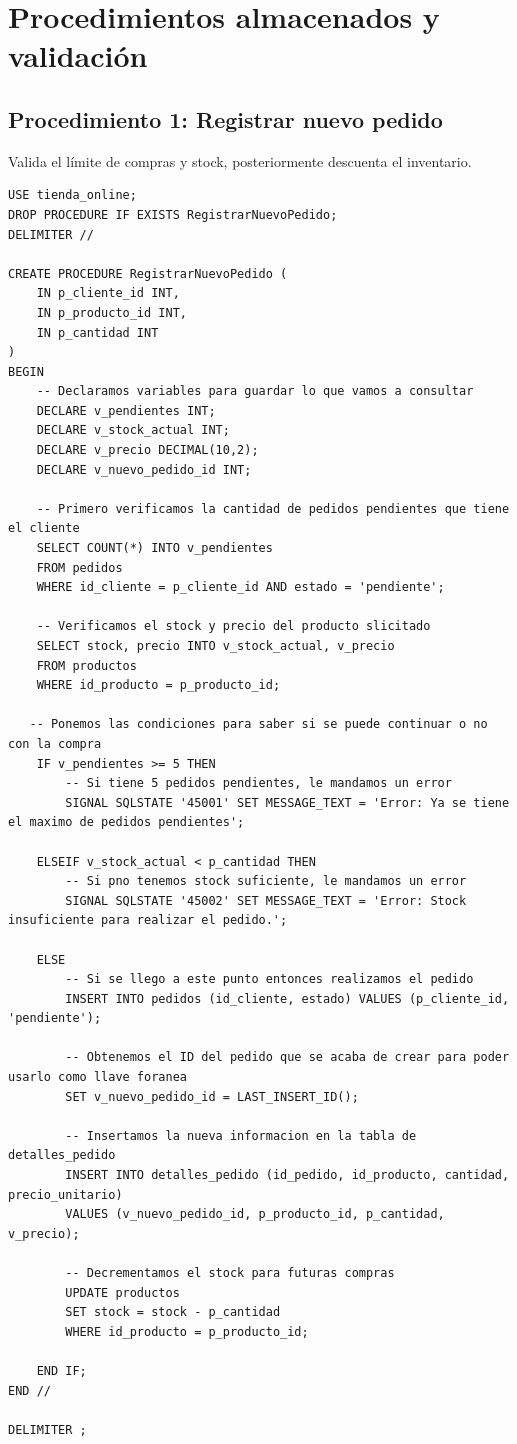 \documentclass[12pt,a4paper]{article}
\begin{document}
\section{Procedimientos almacenados y validación}

\subsection{Procedimiento 1: Registrar nuevo pedido}
Valida el límite de compras y stock, posteriormente descuenta el inventario.
\begin{lstlisting}
USE tienda_online;
DROP PROCEDURE IF EXISTS RegistrarNuevoPedido;
DELIMITER //

CREATE PROCEDURE RegistrarNuevoPedido (
    IN p_cliente_id INT,
    IN p_producto_id INT,
    IN p_cantidad INT
)
BEGIN
    -- Declaramos variables para guardar lo que vamos a consultar
    DECLARE v_pendientes INT;
    DECLARE v_stock_actual INT;
    DECLARE v_precio DECIMAL(10,2);
    DECLARE v_nuevo_pedido_id INT;

    -- Primero verificamos la cantidad de pedidos pendientes que tiene el cliente
    SELECT COUNT(*) INTO v_pendientes
    FROM pedidos
    WHERE id_cliente = p_cliente_id AND estado = 'pendiente';

    -- Verificamos el stock y precio del producto slicitado 
    SELECT stock, precio INTO v_stock_actual, v_precio
    FROM productos
    WHERE id_producto = p_producto_id;

   -- Ponemos las condiciones para saber si se puede continuar o no con la compra
    IF v_pendientes >= 5 THEN
        -- Si tiene 5 pedidos pendientes, le mandamos un error
        SIGNAL SQLSTATE '45001' SET MESSAGE_TEXT = 'Error: Ya se tiene el maximo de pedidos pendientes';
        
    ELSEIF v_stock_actual < p_cantidad THEN
        -- Si pno tenemos stock suficiente, le mandamos un error
        SIGNAL SQLSTATE '45002' SET MESSAGE_TEXT = 'Error: Stock insuficiente para realizar el pedido.';
        
    ELSE
        -- Si se llego a este punto entonces realizamos el pedido 
        INSERT INTO pedidos (id_cliente, estado) VALUES (p_cliente_id, 'pendiente');
        
        -- Obtenemos el ID del pedido que se acaba de crear para poder usarlo como llave foranea 
        SET v_nuevo_pedido_id = LAST_INSERT_ID();

        -- Insertamos la nueva informacion en la tabla de detalles_pedido
        INSERT INTO detalles_pedido (id_pedido, id_producto, cantidad, precio_unitario)
        VALUES (v_nuevo_pedido_id, p_producto_id, p_cantidad, v_precio);

        -- Decrementamos el stock para futuras compras 
        UPDATE productos
        SET stock = stock - p_cantidad
        WHERE id_producto = p_producto_id;
        
    END IF;
END //

DELIMITER ;
\end{lstlisting}
\end{document}

